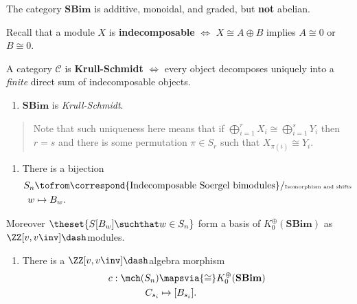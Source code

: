 \begin{remark}

The category \(\mathbf{SBim}\) is additive, monoidal, and graded, but
\textbf{not} abelian.

\end{remark}

\begin{definition}[Indecomposable]

Recall that a module \(X\) is \textbf{indecomposable} \(\iff\)
\(X \cong A\oplus B\) implies \(A\cong 0\) or \(B\cong 0\).

\end{definition}

\begin{definition}

A category \(\mathcal{C}\) is \textbf{Krull-Schmidt} \(\iff\) every
object decomposes uniquely into a \emph{finite} direct sum of
indecomposable objects.

\end{definition}

\begin{theorem}[?]

\hfill

\begin{enumerate}
\def\labelenumi{\arabic{enumi}.}
\tightlist
\item
  \(\mathbf{SBim}\) is \emph{Krull-Schmidt}.
\end{enumerate}

\begin{quote}
Note that such uniqueness here means that if
\(\bigoplus_{i=1}^r X_i \cong \bigoplus_{i=1}^s Y_i\) then \(r=s\) and
there is some permutation \(\pi \in S_r\) such that
\(X_{\pi(i)} \cong Y_i\).
\end{quote}

\begin{enumerate}
\def\labelenumi{\arabic{enumi}.}
\setcounter{enumi}{1}
\tightlist
\item
  There is a bijection
  \begin{align*}
  S_n &\tofrom \correspond{\text{Indecomposable Soergel bimodules} }/ \text{\tiny Isomorphism and shifts} \\
  w &\mapsto B_w
  .\end{align*}
\end{enumerate}

Moreover \(\theset{ S[B_w] \suchthat w\in S_n }\) form a basis of
\(K_0^\oplus(\mathbf{SBim})\) as \(\ZZ[v, v\inv]\dash\)modules.

\begin{enumerate}
\def\labelenumi{\arabic{enumi}.}
\setcounter{enumi}{2}
\tightlist
\item
  There is a \(\ZZ[v, v\inv]\dash\)algebra morphism
  \begin{align*}
  c: \mch(S_n) &\mapsvia{\cong} K_0^\oplus(\mathbf{SBim}) \\
  C_{s_i} &\mapsto [B_{s_i}]
  .\end{align*}
\end{enumerate}

\end{theorem}

